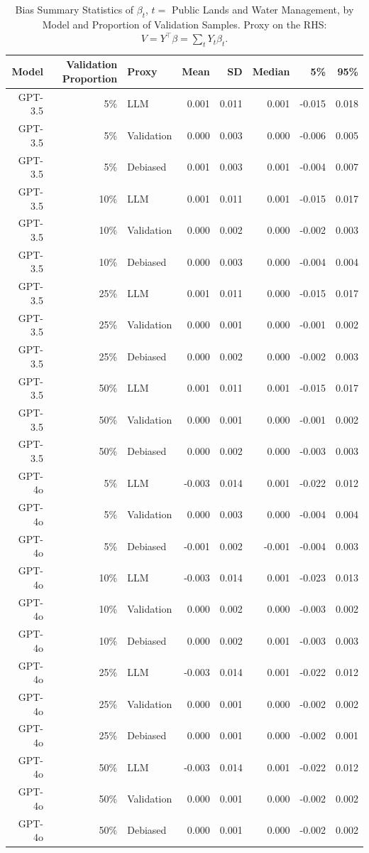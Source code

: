 \begin{table}

\caption{Bias Summary Statistics of $\beta_{t}$, $t=$ Public Lands and Water Management, by Model and Proportion of Validation Samples. Proxy on the RHS: $V = Y^\top \beta = \sum_{t} Y_t \beta_t$.}
\centering
\begin{tabular}[t]{rrlrrrrr}
\toprule
Model & Validation Proportion & Proxy & Mean & SD & Median & 5\% & 95\%\\
\midrule
GPT-3.5 & 5\% & LLM & 0.001 & 0.011 & 0.001 & -0.015 & 0.018\\
GPT-3.5 & 5\% & Validation & 0.000 & 0.003 & 0.000 & -0.006 & 0.005\\
GPT-3.5 & 5\% & Debiased & 0.001 & 0.003 & 0.001 & -0.004 & 0.007\\
GPT-3.5 & 10\% & LLM & 0.001 & 0.011 & 0.001 & -0.015 & 0.017\\
GPT-3.5 & 10\% & Validation & 0.000 & 0.002 & 0.000 & -0.002 & 0.003\\
GPT-3.5 & 10\% & Debiased & 0.000 & 0.003 & 0.000 & -0.004 & 0.004\\
GPT-3.5 & 25\% & LLM & 0.001 & 0.011 & 0.000 & -0.015 & 0.017\\
GPT-3.5 & 25\% & Validation & 0.000 & 0.001 & 0.000 & -0.001 & 0.002\\
GPT-3.5 & 25\% & Debiased & 0.000 & 0.002 & 0.000 & -0.002 & 0.003\\
GPT-3.5 & 50\% & LLM & 0.001 & 0.011 & 0.001 & -0.015 & 0.017\\
GPT-3.5 & 50\% & Validation & 0.000 & 0.001 & 0.000 & -0.001 & 0.002\\
GPT-3.5 & 50\% & Debiased & 0.000 & 0.002 & 0.000 & -0.003 & 0.003\\
GPT-4o & 5\% & LLM & -0.003 & 0.014 & 0.001 & -0.022 & 0.012\\
GPT-4o & 5\% & Validation & 0.000 & 0.003 & 0.000 & -0.004 & 0.004\\
GPT-4o & 5\% & Debiased & -0.001 & 0.002 & -0.001 & -0.004 & 0.003\\
GPT-4o & 10\% & LLM & -0.003 & 0.014 & 0.001 & -0.023 & 0.013\\
GPT-4o & 10\% & Validation & 0.000 & 0.002 & 0.000 & -0.003 & 0.002\\
GPT-4o & 10\% & Debiased & 0.000 & 0.002 & 0.001 & -0.003 & 0.003\\
GPT-4o & 25\% & LLM & -0.003 & 0.014 & 0.001 & -0.022 & 0.012\\
GPT-4o & 25\% & Validation & 0.000 & 0.001 & 0.000 & -0.002 & 0.002\\
GPT-4o & 25\% & Debiased & 0.000 & 0.001 & 0.000 & -0.002 & 0.001\\
GPT-4o & 50\% & LLM & -0.003 & 0.014 & 0.001 & -0.022 & 0.012\\
GPT-4o & 50\% & Validation & 0.000 & 0.001 & 0.000 & -0.002 & 0.002\\
GPT-4o & 50\% & Debiased & 0.000 & 0.001 & 0.000 & -0.002 & 0.002\\
\bottomrule
\end{tabular}
\end{table}
